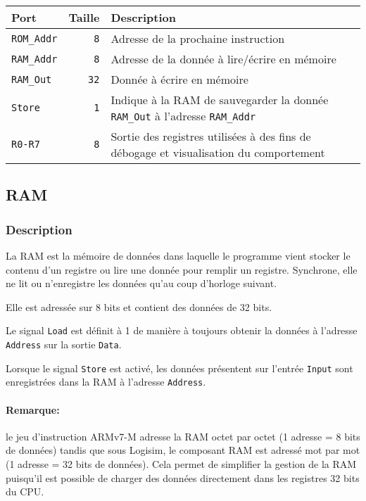 
\begin{tabular}{|l|r|l|}
\hline 
\textbf{Port} & \textbf{Taille} & \textbf{Description}\\
\hline

\hline
\texttt{ROM\_Addr}		&  \texttt{8} & Adresse de la prochaine instruction\\
\hline
\texttt{RAM\_Addr}		&  \texttt{8} & Adresse de la donnée à lire/écrire en mémoire\\
\hline
\texttt{RAM\_Out}		& \texttt{32} & Donnée à écrire en mémoire\\
\hline
\texttt{Store}			&  \texttt{1} & Indique à la RAM de sauvegarder la donnée \texttt{RAM\_Out} à l'adresse \texttt{RAM\_Addr}\\
\hline
\texttt{R0-R7}			& \texttt{8\times 32} & Sortie des registres utilisées à des fins de débogage et visualisation du comportement\\


\hline
\end{tabular}



\subsection{RAM}

\subsubsection{Description}

La RAM est la mémoire de données dans laquelle le programme vient stocker le contenu d'un registre ou lire une donnée pour remplir un registre.
Synchrone, elle ne lit ou n'enregistre les données qu'au coup d'horloge suivant.

Elle est adressée sur 8 bits et contient des données de 32 bits.

Le signal \texttt{Load} est définit à 1 de manière à toujours obtenir la données à l'adresse \texttt{Address} sur la sortie \texttt{Data}.

Lorsque le signal \texttt{Store} est activé, les données présentent sur l'entrée \texttt{Input} sont enregistrées dans la RAM à l'adresse \texttt{Address}.

\paragraph{Remarque:} le jeu d'instruction ARMv7-M adresse la RAM octet par octet (1 adresse = 8 bits de données) tandis que sous Logisim, le composant RAM est adressé mot par mot (1 adresse = 32 bits de données). Cela permet de simplifier la gestion de la RAM puisqu'il est possible de charger des données directement dans les registres 32 bits du CPU.

